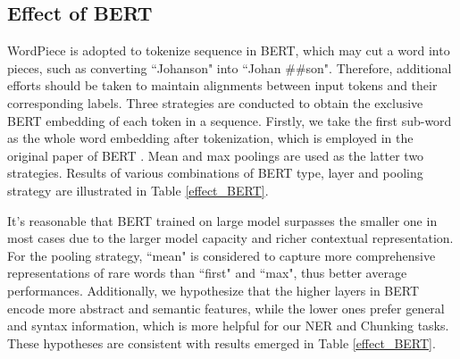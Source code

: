 \documentclass[11pt,a4paper]{article}
\begin{document}
\begin{table*}[t!]
\begin{center}
\end{center}
\caption{ $F_1$ scores on the CoNLL03 and parameter sizes of various models, where ``GRU-384" indicates the conventional GRU with hidden size of 384, while ``DT2-128" refers to deep transition RNN with transition number of 2 and hidden size of 128, similarly for ``DT4-256".}
\label{model_complexity}
\end{table*}

\subsection{Effect of BERT}
WordPiece is adopted to tokenize sequence in BERT, which may cut a word into pieces, such as converting ``Johanson" into ``Johan \#\#son". Therefore, additional efforts should be taken to maintain alignments between input tokens and their corresponding labels.
Three strategies are conducted to obtain the exclusive BERT embedding of each token in a sequence. Firstly, we take the first sub-word as the whole word embedding after tokenization, which is employed in the original paper of BERT \cite{BERT}. Mean and max poolings are used as the latter two strategies. Results of various combinations of BERT type, layer and pooling strategy are illustrated in Table \ref{effect_BERT}.

It's reasonable that BERT trained on large model surpasses the smaller one in most cases due to the larger model capacity and richer contextual representation. For the pooling strategy, ``mean" is considered to capture more comprehensive representations of rare words than ``first" and ``max", thus better average performances. Additionally, we hypothesize that the higher layers in BERT encode more abstract and semantic features, while the lower ones prefer general and syntax information, which is more helpful for our NER and Chunking tasks. These hypotheses are consistent with results emerged in Table \ref{effect_BERT}.
\end{document}
